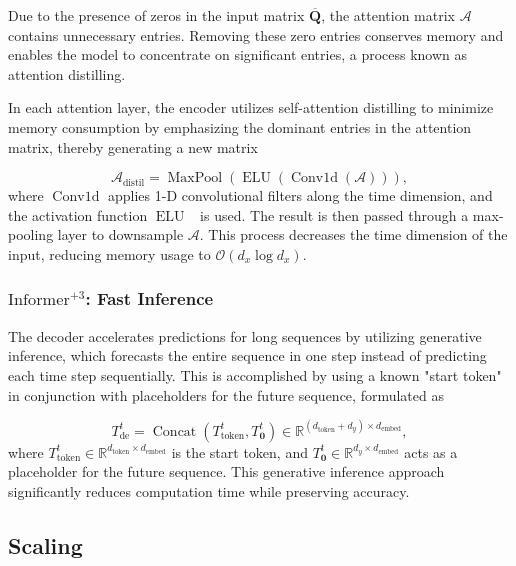 Due to the presence of zeros in the input matrix $\overline{\mathbf{Q}}$, the attention matrix $\mathcal{A}$ contains unnecessary entries. Removing these zero entries conserves memory and enables the model to concentrate on significant entries, a process known as attention distilling.

In each attention layer, the encoder utilizes self-attention distilling to minimize memory consumption by emphasizing the dominant entries in the attention matrix, thereby generating a new matrix

\begin{equation}
\mathcal{A}_{\text{distil}} = \operatorname{MaxPool}\left(\operatorname{ELU}\left(\operatorname{Conv1d}\left(\mathcal{A}\right)\right)\right),
\end{equation}
where $\operatorname{Conv1d}$ applies 1-D convolutional filters along the time dimension, and the activation function $\operatorname{ELU}$~\cite{al2023fhic} is used. The result is then passed through a max-pooling layer to downsample $\mathcal{A}$. This process decreases the time dimension of the input, reducing memory usage to $\mathcal{O}(d_x \log d_x)$.

\subsubsection*{$\text{Informer}^{+3}$: Fast Inference}

The decoder accelerates predictions for long sequences by utilizing generative inference, which forecasts the entire sequence in one step instead of predicting each time step sequentially. This is accomplished by using a known "start token" in conjunction with placeholders for the future sequence, formulated as

\begin{equation}
T_{\mathrm{de}}^{t} = \operatorname{Concat}\left(T_{\text{token}}^{t}, T_{\mathbf{0}}^{t}\right) \in \mathbb{R}^{(d_{\text{token}} + d_y) \times d_{\text{embed}}},
\end{equation}
where $T_{\text{token}}^{t} \in \mathbb{R}^{d_{\text{token}} \times d_{\text{embed}}}$ is the start token, and $T_{\mathbf{0}}^{t} \in \mathbb{R}^{d_y \times d_{\text{embed}}}$ acts as a placeholder for the future sequence. This generative inference approach significantly reduces computation time while preserving accuracy.



\subsection{Scaling}

